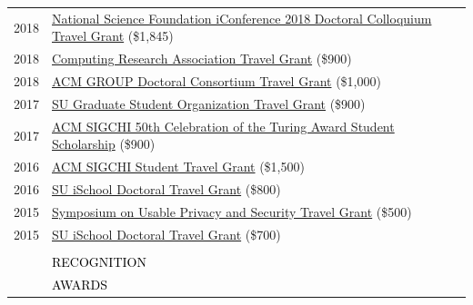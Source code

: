 \documentclass[12pt]{article}
\begin{document}
{\begin{longtable}{R{0.75in}p{5.0in}}
\footnotesize{2018} & \href{https://www.nsf.gov/awardsearch/show-award/?AWD_ID=1713738}{National Science Foundation iConference 2018 Doctoral Colloquium Travel Grant} (\$1,845)\\

\footnotesize{2018} & \href{https://cra.org/events/urmgradcohort/}{Computing Research Association Travel Grant} (\$900)\\

\footnotesize{2018} & \href{https://dl.acm.org/citation.cfm?id=3148330}{ACM GROUP Doctoral Consortium Travel Grant} (\$1,000)\\

\footnotesize{2017} & \href{https://gradorg.syr.edu/}{SU Graduate Student Organization Travel Grant} (\$900)\\

\footnotesize{2017} & \href{https://web.archive.org/web/20240817225719/https://ischool.syr.edu/dosono-to-attend-acm-turing-award-celebration/}{ACM SIGCHI 50th Celebration of the Turing Award Student Scholarship} (\$900)\\

\footnotesize{2016} & \href{https://web.archive.org/web/20250621045246/https://archive.sigchi.org/sigchi-sponsors-students-to-attend-turing-award-celebration/}{ACM SIGCHI Student Travel Grant} (\$1,500)\\

\footnotesize{2016} & \href{https://ischool.syr.edu/grants/}{SU iSchool Doctoral Travel Grant} (\$800)\\

\footnotesize{2015} & \href{https://cups.cs.cmu.edu/soups/2015/cfp.php}{Symposium on Usable Privacy and Security Travel Grant} (\$500)\\

\footnotesize{2015} & \href{https://web.archive.org/web/20191207035855/https://ischool.syr.edu/research/grants-and-awards/}{SU iSchool Doctoral Travel Grant} (\$700)\\\\

\sout{\hfill} 
& \par \Large \textcolor{black}{\uppercase{Recognition\hspace{6pt} \sout{\hfill}}} \medskip \\

& \large \textcolor{black}{\uppercase{Awards}}\\



\end{longtable}}
\end{document}
